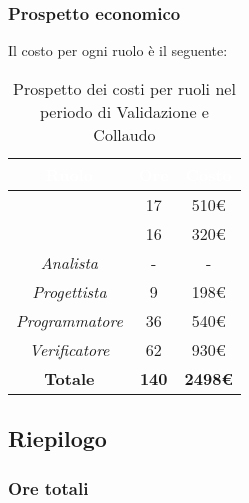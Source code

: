\subsubsection{Prospetto economico}
Il costo per ogni ruolo è il seguente:
\begin{table}[H]
	\begin{center}
		\begin{tabular}{ |c c c| }
		\rowcolor{darkblue} 
		\textcolor{white}{\textbf{Ruolo}} & \textcolor{white}{\textbf{Ore}} & \textcolor{white}{\textbf{Costo}} \\ \hline
		\textit{\Responsabile} 	& 17 	& 510€ \\ \hline
		\textit{\Amministratore} 	& 16 	& 320€ \\ \hline
		\textit{Analista} 		& - 	& - \\ \hline
		\textit{Progettista} 	& 9 	& 198€ \\ \hline
		\textit{Programmatore}  	& 36 	& 540€ \\ \hline
		\textit{Verificatore} 	& 62 	& 930€ \\ \hline
		\textbf{Totale} & \textbf{140} & \textbf{2498€} \\ \hline
		\end{tabular}
	\caption{ Prospetto dei costi per ruoli nel periodo di Validazione e Collaudo}
	\end{center}
\end{table}

\subsection{Riepilogo}
\subsubsection{Ore totali}
